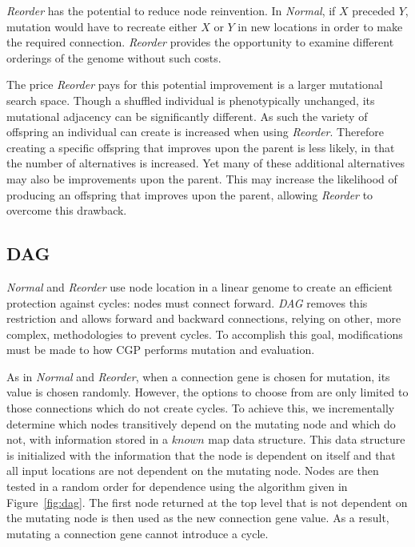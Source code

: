 \documentclass[journal]{IEEEtran}
\begin{document}
\emph{Reorder} has the potential to reduce node reinvention.  In \emph{Normal}, if
$X$ preceded $Y$, mutation would have to recreate either $X$ or $Y$ in new locations
in order to make the required connection.  \emph{Reorder} provides the opportunity
to examine different orderings of the genome without such costs.

The price \emph{Reorder} pays for this potential improvement is a larger mutational search
space.  Though a shuffled individual is phenotypically unchanged,
its mutational adjacency can be significantly different.  As such the variety of offspring
an individual can create is increased when using \emph{Reorder}.
Therefore creating a specific offspring that improves upon the parent is
less likely, in that the number of alternatives is increased.  Yet many
of these additional alternatives may also be improvements upon the parent.  This may
increase the likelihood of producing an offspring that improves
upon the parent, allowing \emph{Reorder} to overcome this drawback.

\subsection{DAG}
\label{sec:dag}
\emph{Normal} and \emph{Reorder} use node location in a linear genome to create
an efficient protection against cycles: nodes must connect forward.  \emph{DAG}
removes this restriction and allows forward and backward connections, relying on other, more complex, methodologies to
prevent cycles.  To accomplish this goal, modifications must be made to how CGP
performs mutation and evaluation.

As in \emph{Normal} and \emph{Reorder}, when a connection gene is chosen for mutation, its value is chosen randomly.
However, the options to choose from are only limited to those connections which do not
create cycles.
To achieve this, we incrementally determine
which nodes transitively depend on the mutating node and which do not, with
information stored in a $known$ map data structure.  This data structure is initialized with
the information that the node is dependent on itself and that all input locations
are not dependent on the mutating node.  Nodes are then
tested in a random order for dependence using the  algorithm given in Figure~\ref{fig:dag}.
The first node returned at the top level that is not dependent on the mutating node is then
used as the new connection gene value.  As a result, mutating a connection gene
cannot introduce a cycle.
\end{document}
